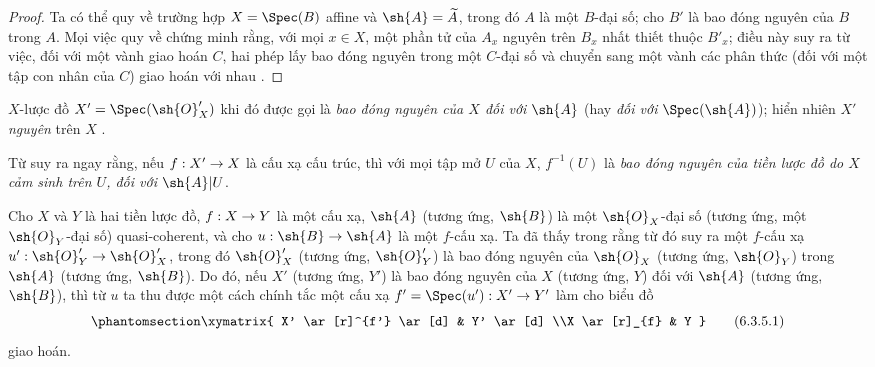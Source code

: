 \documentclass[oneside,10pt]{amsart}
\makeatletter
\newcommand{\ega@arrow}[2]{\mathchoice{#1}{#2}{#2}{#2}}
\renewcommand{\to}{\ega@arrow{\longrightarrow}{\rightarrow}}
\newcommand{\oldpage}[2][]{\marginnote{\normalfont\footnotesize\textbf{#1}~|~#2}\ignorespaces}
\let\EGAOriginalLabel\label
\renewcommand{\label}[1]{\phantomsection\EGAOriginalLabel{#1}}
\makeatother
\begin{document}
\begin{proof}
Ta có thể quy về trường hợp $X=\Spec(B)$ affine và $\sh{A}=\widetilde{A}$, trong đó $A$ là một
\oldpage[II]{118}
$B$-đại số; cho $B'$ là bao đóng nguyên của $B$ trong $A$.
Mọi việc quy về chứng minh rằng, với mọi $x\in X$, một phần tử của $A_x$ nguyên trên $B_x$ nhất thiết thuộc $B'_x$; điều này suy ra từ việc, đối với một vành giao hoán $C$, hai phép lấy bao đóng nguyên trong một $C$-đại số và chuyển sang một vành các phân thức (đối với một tập con nhân của $C$) giao hoán với nhau \cite[t.~I, pp.~261 và 257]{I-13}.
\end{proof}

$X$-lược đồ $X'=\Spec(\sh{O}'_X)$ khi đó được gọi là \emph{bao đóng nguyên của $X$ đối với $\sh{A}$} (hay \emph{đối với $\Spec(\sh{A})$});
hiển nhiên $X'$ \emph{nguyên} trên $X$ .

Từ  suy ra ngay rằng, nếu $f:X'\to X$ là cấu xạ cấu trúc, thì với mọi tập mở $U$ của $X$, $f^{-1}(U)$ là \emph{bao đóng nguyên của tiền lược đồ do $X$ cảm sinh trên $U$, đối với $\sh{A}|U$}.

\begin{env}[6.3.5]
\label{II.6.3.5}
Cho $X$ và $Y$ là hai tiền lược đồ, $f:X\to Y$ là một cấu xạ, $\sh{A}$ (tương ứng, $\sh{B}$) là một $\sh{O}_X$-đại số (tương ứng, một $\sh{O}_Y$-đại số) quasi-coherent, và cho $u:\sh{B}\to\sh{A}$ là một $f$-cấu xạ.
Ta đã thấy trong  rằng từ đó suy ra một $f$-cấu xạ $u':\sh{O}'_Y\to\sh{O}'_X$, trong đó $\sh{O}'_X$ (tương ứng, $\sh{O}'_Y$) là bao đóng nguyên của $\sh{O}_X$ (tương ứng, $\sh{O}_Y$) trong $\sh{A}$ (tương ứng, $\sh{B}$).
Do đó, nếu $X'$ (tương ứng, $Y'$) là bao đóng nguyên của $X$ (tương ứng, $Y$) đối với $\sh{A}$ (tương ứng, $\sh{B}$), thì từ $u$ ta thu được một cách chính tắc một cấu xạ $f'=\Spec(u'):X'\to Y'$  làm cho biểu đồ
\[
\label{II.6.3.5.1}
  \xymatrix{
    X' \ar[r]^{f'} \ar[d]
    & Y' \ar[d]
  \\X \ar[r]_{f}
    & Y
  }
\tag{6.3.5.1}
\]
giao hoán.
\end{env}
\end{document}
